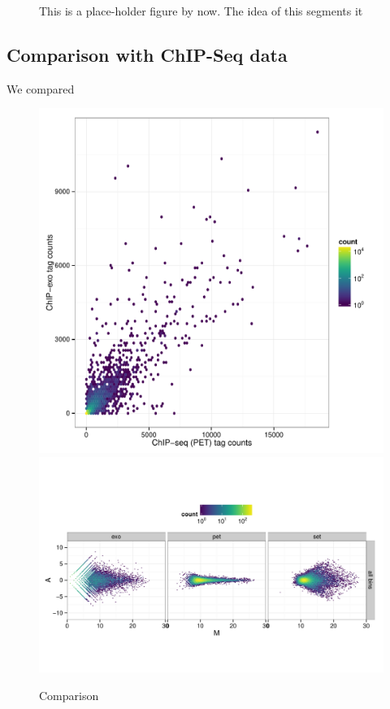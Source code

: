 \documentclass{bmcart}\usepackage[]{graphicx}\usepackage[]{color}
\begin{document}
\begin{figure}[h]
  \centering
 
  \caption{This is a place-holder figure by now. The idea of this segments it }
  \label{fig:fsr}
\end{figure}



\subsection{Comparison with ChIP-Seq data}
\label{sec:comp}

We compared 

\begin{figure}[h]
  \centering
  \includegraphics[width = .6\textwidth,page = 3 ]{../figs/for_paper/ChIPseqPET_ChIPexo_tagCount_comparison.pdf}
  \includegraphics[width = .9\textwidth ]{../figs/for_paper/MA_plot_fwd_bwd_by_seq.pdf}
  \caption{Comparison}
  \label{fig:comp}
\end{figure}



\end{document}
